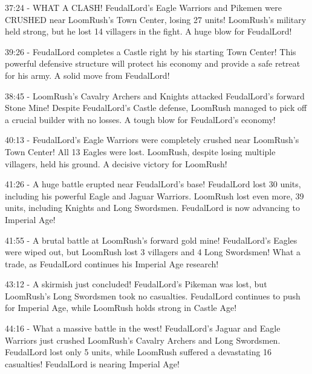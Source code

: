 37:24 - WHAT A CLASH! FeudalLord's Eagle Warriors and Pikemen were CRUSHED near LoomRush's Town Center, losing 27 units! LoomRush's military held strong, but he lost 14 villagers in the fight. A huge blow for FeudalLord! \par \vspace{1em}

39:26 - FeudalLord completes a Castle right by his starting Town Center! This powerful defensive structure will protect his economy and provide a safe retreat for his army. A solid move from FeudalLord! \par \vspace{1em}

38:45 - LoomRush's Cavalry Archers and Knights attacked FeudalLord's forward Stone Mine! Despite FeudalLord's Castle defense, LoomRush managed to pick off a crucial builder with no losses. A tough blow for FeudalLord's economy! \par \vspace{1em}

40:13 - FeudalLord's Eagle Warriors were completely crushed near LoomRush's Town Center! All 13 Eagles were lost. LoomRush, despite losing multiple villagers, held his ground. A decisive victory for LoomRush! \par \vspace{1em}

41:26 - A huge battle erupted near FeudalLord's base! FeudalLord lost 30 units, including his powerful Eagle and Jaguar Warriors. LoomRush lost even more, 39 units, including Knights and Long Swordsmen. FeudalLord is now advancing to Imperial Age! \par \vspace{1em}

41:55 - A brutal battle at LoomRush's forward gold mine! FeudalLord's Eagles were wiped out, but LoomRush lost 3 villagers and 4 Long Swordsmen! What a trade, as FeudalLord continues his Imperial Age research! \par \vspace{1em}

43:12 - A skirmish just concluded! FeudalLord's Pikeman was lost, but LoomRush's Long Swordsmen took no casualties. FeudalLord continues to push for Imperial Age, while LoomRush holds strong in Castle Age! \par \vspace{1em}

44:16 - What a massive battle in the west! FeudalLord's Jaguar and Eagle Warriors just crushed LoomRush's Cavalry Archers and Long Swordsmen. FeudalLord lost only 5 units, while LoomRush suffered a devastating 16 casualties! FeudalLord is nearing Imperial Age! \par \vspace{1em}


